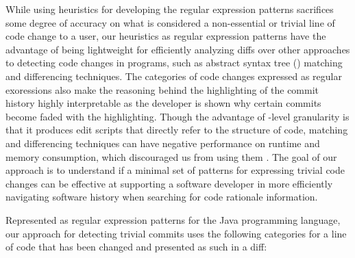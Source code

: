 While using heuristics for developing the regular expression patterns sacrifices some degree of accuracy on what is considered a non-essential or trivial line of code change to a user,
our heuristics as regular expression patterns have the advantage of being lightweight for efficiently analyzing diffs over other approaches to detecting code changes in programs, such as abstract syntax tree () matching and differencing techniques.
The categories of code changes expressed as regular exoressions also make the reasoning behind the highlighting of the commit history highly interpretable as the developer is shown why certain commits become faded with the highlighting.
Though the advantage of -level granularity is that it produces edit scripts that directly refer to the structure of code, 
 matching and differencing techniques can have negative performance on runtime and memory consumption, 
which discouraged us from using them \cite{fluri_change_2007,pawlik_RTED_2011,falleri_fine-grained_2014}.
The goal of our approach is to understand if a minimal set of patterns for expressing trivial code changes can be effective at supporting a software developer in more efficiently navigating software history when searching for code rationale information.

Represented as regular expression patterns for the Java programming language, 
our approach for detecting trivial commits uses the following categories for a line of code that has been changed and presented as such in a diff: 

